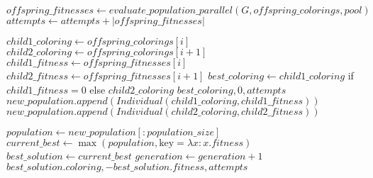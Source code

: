 \documentclass{article}
\begin{document}
\begin{algorithm}
\begin{algorithmic}[1]
    \STATE $offspring\_fitnesses \gets evaluate\_population\_parallel(G, offspring\_colorings, pool)$
    \STATE $attempts \gets attempts + |offspring\_fitnesses|$

        \STATE $child1\_coloring \gets offspring\_colorings[i]$
        \STATE $child2\_coloring \gets offspring\_colorings[i + 1]$
        \STATE $child1\_fitness \gets offspring\_fitnesses[i]$
        \STATE $child2\_fitness \gets offspring\_fitnesses[i + 1]$
            \STATE $best\_coloring \gets child1\_coloring$ if $child1\_fitness = 0$ else $child2\_coloring$
            \STATE \RETURN $best\_coloring, 0, attempts$
        \ENDIF
        \STATE $new\_population.append(Individual(child1\_coloring, child1\_fitness))$
        \STATE $new\_population.append(Individual(child2\_coloring, child2\_fitness))$
    \ENDFOR

    \STATE $population \gets new\_population[:population\_size]$
    \STATE $current\_best \gets \max(population, \text{key} = \lambda x: x.fitness)$
        \STATE $best\_solution \gets current\_best$
    \ENDIF
    \STATE $generation \gets generation + 1$
\ENDWHILE
\STATE \RETURN $best\_solution.coloring, -best\_solution.fitness, attempts$
\end{algorithmic}
\end{algorithm}
\end{document}
